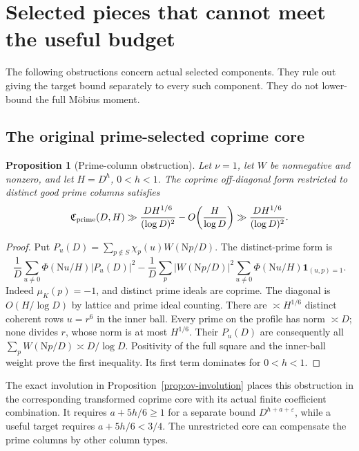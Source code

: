 \documentclass[11pt]{article}
\numberwithin{equation}{section}
\newtheorem{proposition}[theorem]{Proposition}
\theoremstyle{definition}
\theoremstyle{remark}
\newcommand{\N}{\mathrm N}
\newcommand{\muK}{\mu_K}
\newcommand{\ind}{\mathbf 1}
\newcommand{\eps}{\varepsilon}
\begin{document}
\section{Selected pieces that cannot meet the useful budget}
\label{sec:obstructions}

The following obstructions concern actual selected components.
They rule out giving the target bound separately to every such
component. They do not lower-bound the full M\"obius moment.

\subsection{The original prime-selected coprime core}

\begin{proposition}[Prime-column obstruction]\label{prop:prime-core}
Let \(\nu=1\), let \(W\) be nonnegative and nonzero, and let
\(H=D^h\), \(0<h<1\).
The coprime off-diagonal form restricted to distinct good prime
columns satisfies
\begin{equation}\label{eq:prime-core-lower}
 \mathfrak C_{\rm prime}(D,H)
 \gg \frac{DH^{1/6}}{(\log D)^2}-O\!\left(\frac H{\log D}\right)
 \gg \frac{DH^{1/6}}{(\log D)^2}.
\end{equation}
\end{proposition}
\begin{proof}
Put \(P_u(D)=\sum_{p\notin S}\chi_p(u)W(\N p/D)\).
The distinct-prime form is
\[
 \frac1D\sum_{u\ne0}\Phi(\N u/H)|P_u(D)|^2
 -\frac1D\sum_p|W(\N p/D)|^2
          \sum_{u\ne0}\Phi(\N u/H)\ind_{(u,p)=1}.
\]
Indeed \(\muK(p)=-1\), and distinct prime ideals are coprime.
The diagonal is \(O(H/\log D)\) by lattice and prime ideal counting.
There are \(\asymp H^{1/6}\) distinct coherent rows \(u=r^6\) in
the inner ball. Every prime on the profile has norm \(\asymp D\);
none divides \(r\), whose norm is at most \(H^{1/6}\).
Their \(P_u(D)\) are consequently all
\(\sum_pW(\N p/D)\asymp D/\log D\).
Positivity of the full square and the inner-ball weight prove the
first inequality. Its first term dominates for \(0<h<1\).
\end{proof}

The exact involution in Proposition~\ref{prop:ov-involution}
places this obstruction in the corresponding transformed coprime
core with its actual finite coefficient combination.
It requires \(a+5h/6\ge1\) for a separate bound
\(D^{h+a+\eps}\), while a useful target requires
\(a+5h/6<3/4\). The unrestricted core can compensate the prime
columns by other column types.
\end{document}
